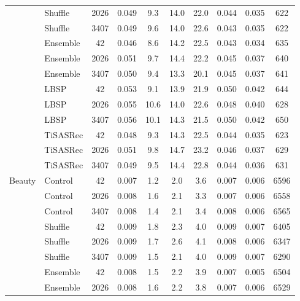 \begin{longtable}{@{}llS[table-format=4.0,group-digits=false]S[table-format=1.3]S[table-format=2.1]S[table-format=2.1]S[table-format=2.1]S[table-format=1.3]S[table-format=1.3]S[table-format=5.0]@{}}
 & Shuffle & 2026 & 0.049 & 9.3 & 14.0 & 22.0 & 0.044 & 0.035 & 622\\ %
 & Shuffle & 3407 & 0.049 & 9.6 & 14.0 & 22.6 & 0.043 & 0.035 & 622\\ %
 & Ensemble & 42 & 0.046 & 8.6 & 14.2 & 22.5 & 0.043 & 0.034 & 635\\ %
 & Ensemble & 2026 & 0.051 & 9.7 & 14.4 & 22.2 & 0.045 & 0.037 & 640\\ %
 & Ensemble & 3407 & 0.050 & 9.4 & 13.3 & 20.1 & 0.045 & 0.037 & 641\\ %
 & LBSP & 42 & 0.053 & 9.1 & 13.9 & 21.9 & 0.050 & 0.042 & 644\\ %
 & LBSP & 2026 & 0.055 & 10.6 & 14.0 & 22.6 & 0.048 & 0.040 & 628\\ %
 & LBSP & 3407 & 0.056 & 10.1 & 14.3 & 21.5 & 0.050 & 0.042 & 650\\ %
 & TiSASRec & 42 & 0.048 & 9.3 & 14.3 & 22.5 & 0.044 & 0.035 & 623\\ %
 & TiSASRec & 2026 & 0.051 & 9.8 & 14.7 & 23.2 & 0.046 & 0.037 & 629\\ %
 & TiSASRec & 3407 & 0.049 & 9.5 & 14.4 & 22.8 & 0.044 & 0.036 & 631\\ %
\midrule
Beauty & Control & 42 & 0.007 & 1.2 & 2.0 & 3.6 & 0.007 & 0.006 & 6596\\ %
 & Control & 2026 & 0.008 & 1.6 & 2.1 & 3.3 & 0.007 & 0.006 & 6558\\ %
 & Control & 3407 & 0.008 & 1.4 & 2.1 & 3.4 & 0.008 & 0.006 & 6565\\ %
 & Shuffle & 42 & 0.009 & 1.8 & 2.3 & 4.0 & 0.009 & 0.007 & 6405\\ %
 & Shuffle & 2026 & 0.009 & 1.7 & 2.6 & 4.1 & 0.008 & 0.006 & 6347\\ %
 & Shuffle & 3407 & 0.009 & 1.5 & 2.1 & 4.0 & 0.009 & 0.007 & 6290\\ %
 & Ensemble & 42 & 0.008 & 1.5 & 2.2 & 3.9 & 0.007 & 0.005 & 6504\\ %
 & Ensemble & 2026 & 0.008 & 1.6 & 2.2 & 3.8 & 0.007 & 0.006 & 6529\\ %

\end{longtable}
